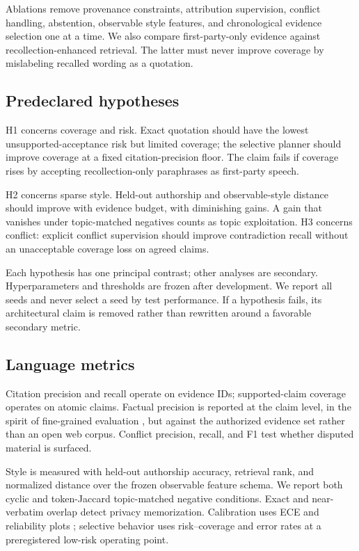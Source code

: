 \documentclass[11pt,a4paper]{article}
\begin{document}
Ablations remove provenance constraints, attribution supervision, conflict
handling, abstention, observable style features, and chronological evidence
selection one at a time.  We also compare first-party-only evidence against
recollection-enhanced retrieval.  The latter must never improve coverage by
mislabeling recalled wording as a quotation.

\subsection{Predeclared hypotheses}

H1 concerns coverage and risk.  Exact quotation should have the lowest
unsupported-acceptance risk but limited coverage; the selective planner should
improve coverage at a fixed citation-precision floor.  The claim fails if
coverage rises by accepting recollection-only paraphrases as first-party speech.

H2 concerns sparse style.  Held-out authorship and observable-style distance
should improve with evidence budget, with diminishing gains.  A gain that
vanishes under topic-matched negatives counts as topic exploitation.  H3
concerns conflict: explicit conflict supervision should improve contradiction
recall without an unacceptable coverage loss on agreed claims.

Each hypothesis has one principal contrast; other analyses are secondary.
Hyperparameters and thresholds are frozen after development.  We report all
seeds and never select a seed by test performance.  If a hypothesis fails, its
architectural claim is removed rather than rewritten around a favorable
secondary metric.

\subsection{Language metrics}

Citation precision and recall operate on evidence IDs; supported-claim coverage
operates on atomic claims.  Factual precision is reported at the claim level,
in the spirit of fine-grained evaluation \citep{min-etal-2023-factscore}, but
against the authorized evidence set rather than an open web corpus.  Conflict
precision, recall, and F1 test whether disputed material is surfaced.

Style is measured with held-out authorship accuracy, retrieval rank, and
normalized distance over the frozen observable feature schema.  We report both
cyclic and token-Jaccard topic-matched negative conditions.  Exact and
near-verbatim overlap detect
privacy memorization.  Calibration uses ECE and reliability plots
\citep{guo2017calibration}; selective behavior uses risk--coverage and error
rates at a preregistered low-risk operating point.
\end{document}
